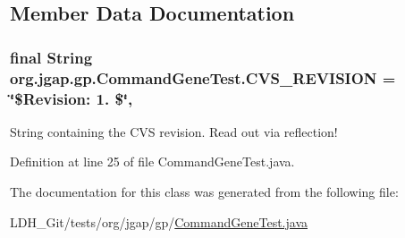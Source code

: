 \subsection{Member Data Documentation}
\hypertarget{classorg_1_1jgap_1_1gp_1_1_command_gene_test_ad59edb3f84c045b44ab1fe19e71100ba}{
\subsubsection[{C\-V\-S\-\_\-\-R\-E\-V\-I\-S\-I\-O\-N}]{\setlength{\rightskip}{0pt plus 5cm}final String org.\-jgap.\-gp.\-Command\-Gene\-Test.\-C\-V\-S\-\_\-\-R\-E\-V\-I\-S\-I\-O\-N = \char`\"{}\$Revision\-: 1. \$\char`\"{}\hspace{0.3cm}{\ttfamily [static]}, {\ttfamily [private]}}}\label{classorg_1_1jgap_1_1gp_1_1_command_gene_test_ad59edb3f84c045b44ab1fe19e71100ba}
String containing the C\-V\-S revision. Read out via reflection! 

Definition at line 25 of file Command\-Gene\-Test.\-java.



The documentation for this class was generated from the following file\-:\begin{DoxyCompactItemize}
\item 
L\-D\-H\-\_\-\-Git/tests/org/jgap/gp/\hyperlink{_command_gene_test_8java}{Command\-Gene\-Test.\-java}\end{DoxyCompactItemize}
